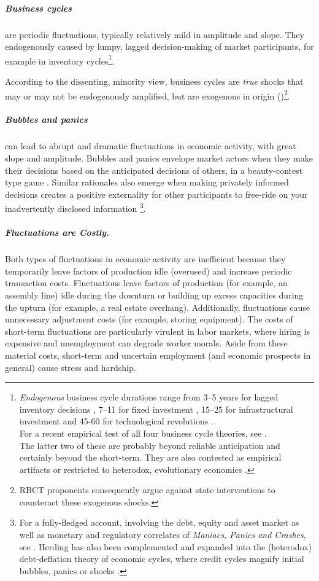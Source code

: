\subparagraph{Business cycles} are periodic fluctuations, typically relatively mild in amplitude and slope. They endogenously caused by lumpy, lagged decision-making of market participants, for example in inventory cycles\footnote{
	\emph{Endogenous} business cycle durations range from 3--5 years for lagged inventory decisions \citep{Kitchin1923}, 7--11 for fixed investment \citep{Juglar1862}, 15--25 for infrastructural investment \citep{Kuznets1930} and 45-60 for technological revolutions \citep{Kondratiev1925}. \\ For a recent empirical test of all four business cycle theories, see \cite{Korotayev2010}. \\ The latter two of these are probably beyond reliable anticipation and certainly beyond the short-term. They are also contested as empirical artifacts \citep{Howrey1968} or restricted to heterodox, evolutionary economics \citep{Modelski2010}.}.

According to the dissenting, minority view, business cycles are \emph{true} shocks that may or may not be endogenously amplified, but are exogenous in origin (\citealt{Kydland1982})\footnote{
	\gls{RBCT} proponents consequently argue against state interventions to counteract these exogenous shocks.}.

\subparagraph{Bubbles and panics} can lead to abrupt and dramatic fluctuations in economic activity, with great slope and amplitude. Bubbles and panics envelope market actors when they make their decisions based on the anticipated decisions of others, in a beauty-contest type game \citep{Keynes1936}. Similar rationales also emerge when making privately informed decisions creates a positive externality for other participants to free-ride on your inadvertently disclosed information \citep{Banerjee-1992-aa}\footnote{
	For a fully-fledged account, involving the debt, equity and asset market as well as monetary and regulatory correlates of \emph{Maniacs, Panics and Crashes}, see \cite{KindlebergerAliber-2005-aa}. Herding has also been complemented and expanded into the (heterodox) debt-deflation theory of economic cycles, where credit cycles magnify initial bubbles, panics or shocks \citep{Fisher1933}.}.

\subparagraph{Fluctuations are Costly.} Both types of fluctuations in economic activity are inefficient because they temporarily leave factors of production idle (overused) and increase periodic transaction costs. Fluctuations  leave factors of production (for example, an assembly line) idle during the downturn or building up excess capacities during the upturn (for example, a real estate overhang). Additionally, fluctuations cause unnecessary adjustment costs (for example, storing equipment). The costs of short-term fluctuations are particularly virulent in labor markets, where hiring is expensive and unemployment can degrade worker morale. Aside from these material costs, short-term and uncertain employment (and economic prospects in general) cause stress and hardship. %

